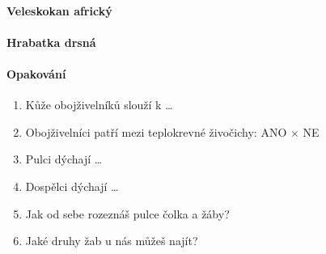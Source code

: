 \paragraph{Veleskokan africký}

\paragraph{Hrabatka drsná}


\paragraph{Opakování}
\begin{enumerate}
\item Kůže obojživelníků slouží k \ldots
\item Obojživelníci patří mezi teplokrevné živočichy: ANO $\times$ NE
\item Pulci dýchají \ldots
\item Dospělci dýchají \ldots
\item Jak od sebe rozeznáš pulce čolka a žáby?
\item Jaké druhy žab u nás můžeš najít?
\end{enumerate}

